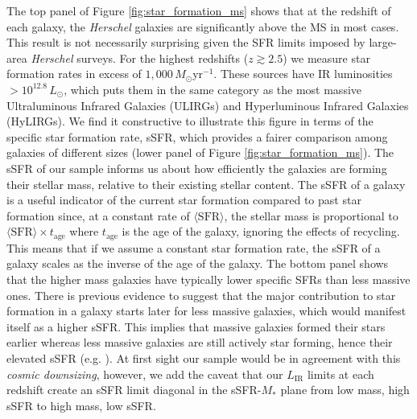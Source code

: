 The top panel of Figure \ref{fig:star_formation_ms} shows that at the redshift of each galaxy, the \textit{Herschel} galaxies are significantly above the MS in most cases. This result is not necessarily surprising given the SFR limits imposed by large-area \textit{Herschel} surveys. For the highest redshifts ($z \gtrsim 2.5$) we measure star formation rates in excess of $1,000\,M_\odot$yr$^{-1}$. These sources have IR luminosities $> 10^{12.8}\,L_\odot$, which puts them in the same category as the most massive Ultraluminous Infrared Galaxies (ULIRGs) and Hyperluminous Infrared Galaxies (HyLIRGs). We find it constructive to illustrate this figure in terms of the specific star formation rate, sSFR, which provides a fairer comparison among galaxies of different sizes (lower panel of Figure \ref{fig:star_formation_ms}). The sSFR of our sample informs us about how efficiently the galaxies are forming their stellar mass, relative to their existing stellar content. The sSFR of a galaxy is a useful indicator of the current star formation compared to past star formation since, at a constant rate of $\langle\textrm{SFR}\rangle$, the stellar mass is proportional to $\langle \textrm{SFR} \rangle \times t_{\textrm{age}}$ where $t_{\textrm{age}}$ is the age of the galaxy, ignoring the effects of recycling. This means that if we assume a constant star formation rate, the sSFR of a galaxy scales as the inverse of the age of the galaxy. The bottom panel shows that the higher mass galaxies have typically lower specific SFRs than less massive ones. There is previous evidence to suggest that the major contribution to star formation in a galaxy starts later for less massive galaxies, which would manifest itself as a higher sSFR. This implies that massive galaxies formed their stars earlier whereas less massive galaxies are still actively star forming, hence their elevated sSFR (e.g. \citealt{Brinchmann_2000, Juneau_2005, Bell_2005, Caputi_2006, Reddy_2006, Noeske_2007}). At first sight our sample would be in agreement with this \textit{cosmic downsizing}, however, we add the caveat that our $L_{\textrm{IR}}$ limits at each redshift create an sSFR limit diagonal in the sSFR-$M_*$ plane from low mass, high sSFR to high mass, low sSFR.

